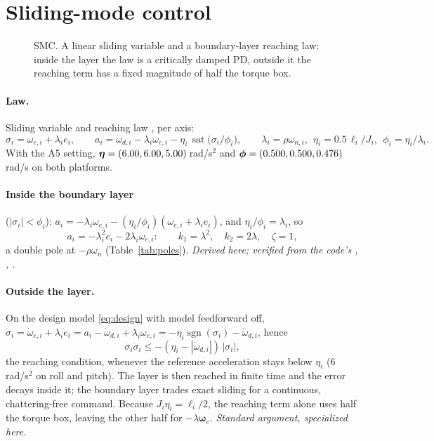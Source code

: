 \documentclass[11pt]{article}
\newcommand{\srcroot}{../..}
\newcommand{\sat}{\operatorname{sat}}
\newcommand{\code}[1]{\path{#1}}
\theoremstyle{remark}
\newcommand{\listing}[4]{%
  \Needspace{8\baselineskip}%
  }
\newcommand{\archfig}[3]{%
  \begin{figure}[H]\centering\resizebox{\textwidth}{!}{}\caption{#2}\label{#3}\end{figure}}
\begin{document}
\listing{experiments/nengo_nef_replication_2026-08-29/run_mujoco_nef_baselines.py}{132}{137}{$K=[\omega^2,\sqrt2\omega]$}
\listing{experiments/nengo_nef_replication_2026-08-29/run_mujoco_nef_baselines.py}{232}{233}{the law: $\bm a=\dot{\bm\omega}_d-k_1\bm e-k_2\bm\omega_e$}

\section{Sliding-mode control}\label{sec:smc}
\archfig{fig_smc.tex}{SMC. A linear sliding variable and a boundary-layer reaching law; inside the layer the law is a critically
damped PD, outside it the reaching term has a fixed magnitude of half the torque box.}{fig:smc}

\paragraph{Law.} Sliding variable and reaching law \cite{utkin1992sliding,slotine1991applied}, per axis:
\begin{equation}
\sigma_i=\omega_{e,i}+\lambda_ie_i,\qquad
a_i=\dot\omega_{d,i}-\lambda_i\omega_{e,i}-\eta_i\,\sat\!\big(\sigma_i/\phi_i\big),\qquad
\lambda_i=\rho\omega_{n,i},\ \ \eta_i=0.5\,\ell_i/J_i,\ \ \phi_i=\eta_i/\lambda_i .
\label{eq:smc}
\end{equation}
With the A5 setting, $\bm\eta=(6.00, 6.00, 5.00)$\,rad/s$^2$ and $\bm\phi=(0.500, 0.500, 0.476)$\,rad/s on both platforms.

\paragraph{Inside the boundary layer} ($|\sigma_i|<\phi_i$): $a_i=-\lambda_i\omega_{e,i}-(\eta_i/\phi_i)(\omega_{e,i}+\lambda_ie_i)$, and
$\eta_i/\phi_i=\lambda_i$, so
\[
a_i=-\lambda_i^2e_i-2\lambda_i\omega_{e,i}:\qquad k_1=\lambda^2,\quad k_2=2\lambda,\quad \zeta=1,
\]
a double pole at $-\rho\omega_n$ (Table~\ref{tab:poles}). \emph{Derived here; verified from the code's
\code{lam}, \code{eta}, \code{phi}.}

\paragraph{Outside the layer.} On the design model \eqref{eq:design} with model feedforward off,
$\dot\sigma_i=\dot\omega_{e,i}+\lambda_i\dot e_i=a_i-\dot\omega_{d,i}+\lambda_i\omega_{e,i}=-\eta_i\operatorname{sgn}(\sigma_i)-\dot\omega_{d,i}$,
hence
\[
\sigma_i\dot\sigma_i\le-(\eta_i-|\dot\omega_{d,i}|)\,|\sigma_i| ,
\]
the reaching condition, whenever the reference acceleration stays below $\eta_i$ ($6$\,rad/s$^2$ on roll and pitch). The layer
is then reached in finite time and the error decays inside it; the boundary layer trades exact sliding for a continuous,
chattering-free command. Because $J_i\eta_i=\ell_i/2$, the reaching term alone uses half the torque box, leaving the
other half for $-\lambda\bm\omega_e$. \emph{Standard argument, specialized here.}
\end{document}
